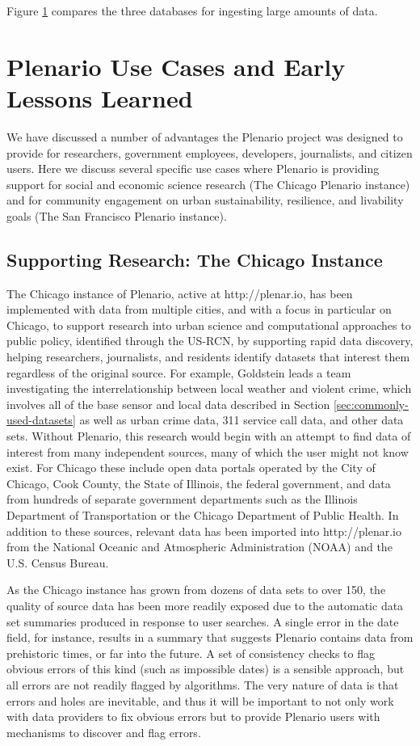 \documentclass[11pt]{article}
\begin{document}
Figure \ref{} compares the three databases for ingesting large amounts of data. 



\section{Plenario Use Cases and Early Lessons Learned}
We have discussed a number of advantages the Plenario project was designed to provide for researchers, government employees, developers, journalists, and citizen users. Here we discuss several specific use cases where Plenario is providing support for social and economic science research (The Chicago Plenario instance) and for community engagement on urban sustainability, resilience, and livability goals (The San Francisco Plenario instance). 

\subsection{\textbf{Supporting Research: The Chicago Instance}}\label{chicago-instance}
The Chicago instance of Plenario, active at http://plenar.io, has been implemented with data from multiple cities, and with a focus in particular on Chicago, to support research\textit{ }into urban science and computational approaches to public policy, identified through the US-RCN, by supporting rapid data discovery, helping researchers, journalists, and residents identify datasets that interest them regardless of the original source. For example, Goldstein leads a team investigating the interrelationship between local weather and violent crime, which involves all of the base sensor and local data described in Section \ref{sec:commonly-used-datasets} as well as urban crime data, 311 service call data, and other data sets. Without Plenario, this research would begin with an attempt to find data of interest from many independent sources, many of which the user might not know exist. For Chicago these include open data portals operated by the City of Chicago, Cook County, the State of Illinois, the federal government, and data from hundreds of separate government departments such as the Illinois Department of Transportation or the Chicago Department of Public Health. In addition to these sources, relevant data has been imported into http://plenar.io from the National Oceanic and Atmospheric Administration (NOAA) and the U.S. Census Bureau. 

As the Chicago instance has grown from dozens of data sets to over 150, the quality of source data has been more readily exposed due to the automatic data set summaries produced in response to user searches. A single error in the date field, for instance, results in a summary that suggests Plenario contains data from prehistoric times, or far into the future. A set of consistency checks to flag obvious errors of this kind (such as impossible dates) is a sensible approach, but all errors are not readily flagged by algorithms. The very nature of data is that errors and holes are inevitable, and thus it will be important to not only work with data providers to fix obvious errors but to provide Plenario users with mechanisms to discover and flag errors. 
\end{document}
